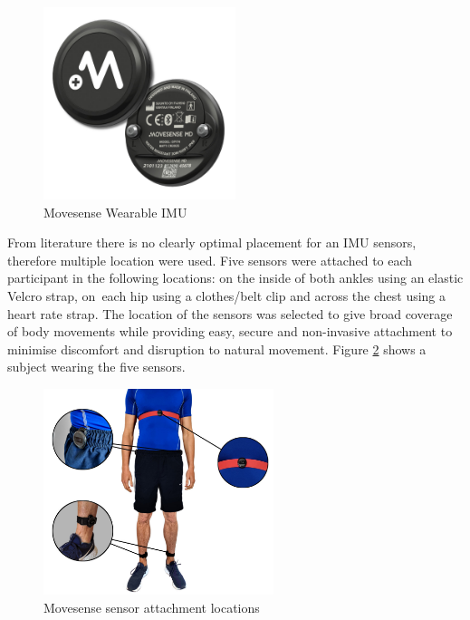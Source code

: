 \begin{figure}[!htb]
    \centering
    \includegraphics[width=0.5\textwidth]{content/3-Methods/Movesense-MD-front-and-back.jpg}
    \caption[Movesense Wearable IMU]{Movesense Wearable IMU\cite{movesensepress2022}}
    \label{fig:methods-movesense-sensor}
\end{figure}

From literature there is no clearly optimal placement for an IMU sensors, therefore multiple location were used. Five sensors were attached to each participant in the following locations: on the inside of both ankles using an elastic Velcro strap, on~each hip using a clothes/belt clip and across the chest using a heart rate strap. The location of the sensors was selected to give broad coverage of body movements while providing easy, secure and non-invasive attachment to minimise discomfort and disruption to natural movement. Figure \ref{fig:methods-movesense-sensor-locations} shows a subject wearing the five sensors.

\begin{figure}[!htb]
    \centering
    \includegraphics[width=0.6\textwidth]{content/3-Methods/sensor_locations.jpg}
    \caption[Movesense sensor attachment locations]{Movesense sensor attachment locations\cite{Sherratt2021}}
    \label{fig:methods-movesense-sensor-locations}
\end{figure}

